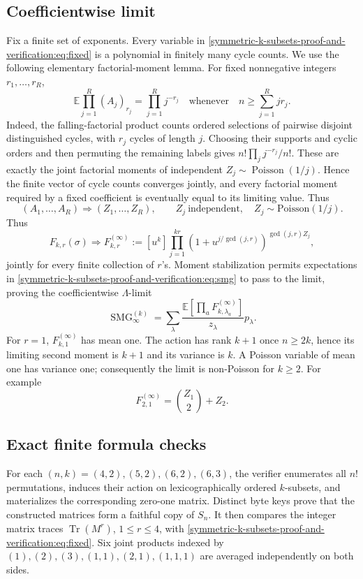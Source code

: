 \documentclass[10pt]{article}
\newcommand{\SMG}{\operatorname{SMG}}
\begin{document}
\subsection{Coefficientwise limit}
Fix a finite set of exponents.  Every variable in \eqref{symmetric-k-subsets-proof-and-verification:eq:fixed} is a
polynomial in finitely many cycle counts.  We use the following elementary
factorial-moment lemma.  For fixed nonnegative integers $r_1,\ldots,r_R$,
\[
\mathbb E\prod_{j=1}^R(A_j)_{r_j}=\prod_{j=1}^Rj^{-r_j}
\quad\text{whenever}\quad n\geq\sum_{j=1}^Rjr_j.
\]
Indeed, the falling-factorial product counts ordered selections of pairwise
disjoint distinguished cycles, with $r_j$ cycles of length $j$.  Choosing
their supports and cyclic orders and then permuting the remaining labels gives
$n!\prod_jj^{-r_j}/n!$.  These are exactly the joint factorial moments of
independent $Z_j\sim\operatorname{Poisson}(1/j)$.  Hence the finite vector of
cycle counts converges jointly, and every factorial moment required by a fixed
coefficient is eventually equal to its limiting value.  Thus
\[
(A_1,\ldots,A_R)\Longrightarrow(Z_1,\ldots,Z_R),\qquad
Z_j\ \text{independent},\quad Z_j\sim\mathrm{Poisson}(1/j).
\]
Thus
\[
F_{k,r}(\sigma)\Longrightarrow F^{(\infty)}_{k,r}:=
[u^k]\prod_{j=1}^{kr}
(1+u^{j/\gcd(j,r)})^{\gcd(j,r)Z_j},
\]
jointly for every finite collection of $r$'s.  Moment stabilization permits
expectations in \eqref{symmetric-k-subsets-proof-and-verification:eq:smg} to pass to the limit, proving the coefficientwise
$\Lambda$-limit
\[
\boxed{\SMG^{(k)}_\infty=\sum_\lambda
\frac{\mathbb E[\prod_aF^{(\infty)}_{k,\lambda_a}]}{z_\lambda}p_\lambda.}
\]
For $r=1$, $F^{(\infty)}_{k,1}$ has mean one.  The action has rank $k+1$
once $n\ge2k$, hence its limiting second moment is $k+1$ and its variance is
$k$.  A Poisson variable of mean one has variance one; consequently the limit
is non-Poisson for $k\ge2$.  For example
\[
F^{(\infty)}_{2,1}=\binom{Z_1}{2}+Z_2.
\]

\subsection{Exact finite formula checks}
For each $(n,k)=(4,2),(5,2),(6,2),(6,3)$, the verifier enumerates all $n!$
permutations, induces their action on lexicographically ordered $k$-subsets,
and materializes the corresponding zero-one matrix.  Distinct byte keys prove
that the constructed matrices form a faithful copy of $S_n$.  It then compares
the integer matrix traces $\operatorname{Tr}(M^r)$, $1\le r\le4$, with
\eqref{symmetric-k-subsets-proof-and-verification:eq:fixed}.  Six joint products indexed by
$(1),(2),(3),(1,1),(2,1),(1,1,1)$ are averaged independently on both sides.
\end{document}
